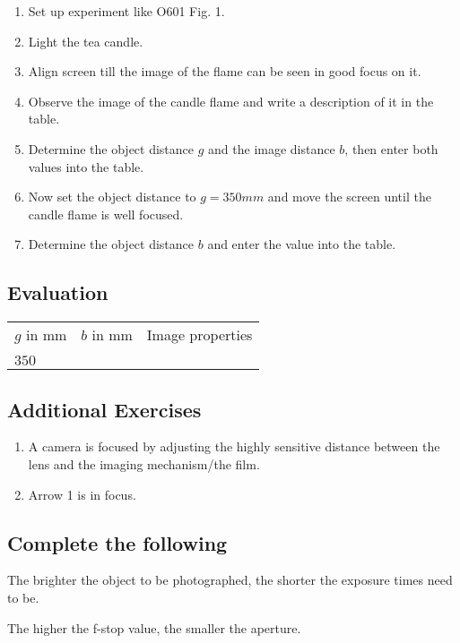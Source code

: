 \documentclass[12pt]{article}
\begin{document}
\begin{enumerate}
\item Set up experiment like O601 Fig. 1.
\item Light the tea candle.
\item Align screen till the image of the flame can be seen in good focus on it.
\item Observe the image of the candle flame and write a description of it in the table.
\item Determine the object distance $g$ and the image distance $b$, then enter both values into the table.
\item Now set the object distance to $g=350mm$ and move the screen until the candle flame is well focused.
\item Determine the object distance $b$ and enter the value into the table.
\end{enumerate}

\subsection*{Evaluation}

\begin{table}[]
\begin{tabular}{lll}
$g$ in mm & $b$ in mm & Image properties \\
 &  &  \\
$350$ &  & 
\end{tabular}
\end{table}

\subsection*{Additional Exercises}

\begin{enumerate}
\item A camera is focused by adjusting the highly sensitive distance between the lens and the imaging mechanism/the film.
\item Arrow 1 is in focus.
\end{enumerate}

\subsection*{Complete the following}

The brighter the object to be photographed, the shorter the exposure times need to be. 

The higher the f-stop value, the smaller the aperture.
\end{document}
